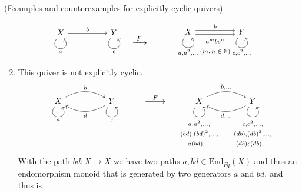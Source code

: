 \begin{example}{(Examples and counterexamples for explicitly cyclic quivers)}
\begin{enumerate}
\[
\begin{minipage}{.10\textwidth}
\phantom{}
\end{minipage}
\begin{minipage}{.30\textwidth}
\begin{tikzcd}
{X} \arrow["a"', loop, distance=2em, in=305, out=235] \arrow[rr, "b"] &  & {Y} \arrow["c"', loop, distance=2em, in=305, out=235]
\end{tikzcd}
\end{minipage}
%
\begin{minipage}{.15\textwidth}
$\xrightarrow{\text{     }F\text{     }}$
\end{minipage}
%
\begin{minipage}{.35\textwidth}
\begin{tikzcd}
{X} \arrow["{a,a^{2},\dots}"', loop, distance=2em, in=305, out=235] \arrow[rr, "b", shift left] \arrow[rr, "{\begin{matrix} \text{$a^{m}bc^{n}$}
\\ \text{$(m,n\in\mathbb{N})$} \end{matrix}}"', shift right] &  & {Y} \arrow["{c,c^{2},\dots}"', loop, distance=2em, in=305, out=235]
\end{tikzcd}
\end{minipage}
%
\begin{minipage}{.10\textwidth}
\phantom{}
\end{minipage}
\]
\item This quiver is not explicitly cyclic.
\[
\begin{tikzcd}
X \arrow["a"', loop, distance=2em, in=305, out=235] \arrow[rr, "b", bend left] &  & Y \arrow["c"', loop, distance=2em, in=305, out=235] \arrow[ll, "d", bend left] & {} \arrow[r, "F"] & {} & X \arrow["{\begin{matrix}a,a^{2},\dots, \\ (bd),(bd)^{2},\dots, \\ a(bd),\dots \end{matrix}}"', loop, distance=2em, in=305, out=235] \arrow[rr, "{b,\dots}", bend left] &  & Y \arrow[ll, "{d,\dots}", bend left] \arrow["{\begin{matrix} c,c^{2},\dots, \\(db),(db)^{2},\dots, \\ (db)c(db),\dots \end{matrix}}"', loop, distance=2em, in=305, out=235]
\end{tikzcd}
\]
With the path $bd : X \rightarrow X$ we have two paths
$a, bd \in \mathrm{End}_{Fq}(X)$ and thus an endomorphism monoid that is generated by two generators $a$ and $bd$, and thus is

\end{enumerate}
\end{example}
